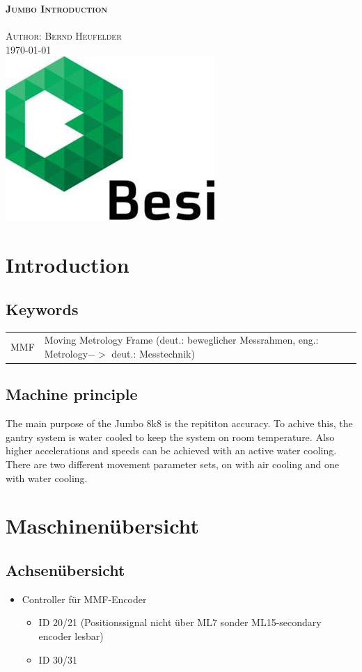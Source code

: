 \documentclass[a4paper, 12pt]{article}
\begin{document}
	\begin{titlepage}
		\center 
		\textsc{\huge \bfseries Jumbo Introduction}\\[1cm] 
		\textsc{\Large }\\[0.5cm] 
		\textsc{\large Author: Bernd Heufelder}\\[0.5cm] 
		{\large \today}\\[1cm] 
		\includegraphics[width=0.3\linewidth]{./pics/BesiLogo.jpg}\\[1cm]
		\begin{flushleft}
			\tableofcontents
		\end{flushleft}
	\end{titlepage}
	\section{Introduction}
		\subsection{Keywords}
			\begin{tabular}{lp{15cm}}
				MMF & Moving Metrology Frame (deut.: beweglicher Messrahmen, eng.: Metrology$ -> $ deut.: Messtechnik)
			\end{tabular}
		\subsection{Machine principle}
			The main purpose of the Jumbo 8k8 is the repititon accuracy. To achive this, the gantry system is water cooled to keep the system on room temperature. Also higher accelerations and speeds can be achieved with an active water cooling. There are two different movement parameter sets, on with air cooling and one with water cooling.
	\section{Maschinenübersicht}
		\subsection{Achsenübersicht}
			\begin{itemize}
				\item Controller für MMF-Encoder
				\begin{itemize}
					\item ID 20/21 (Positionssignal nicht über ML7 sonder ML15-secondary encoder lesbar)
					\item ID 30/31
				\end{itemize}
			\end{itemize}
		
\end{document}
